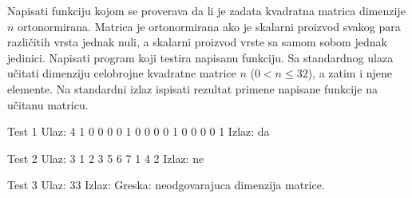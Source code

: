 \begin{Exercise}[label=324]
Napisati funkciju kojom se proverava da li je zadata kvadratna
matrica dimenzije $n$ ortonormirana. Matrica je ortonormirana
ako je skalarni proizvod svakog para različitih vrsta jednak
nuli, a skalarni proizvod vrste sa samom sobom jednak jedinici.
Napisati program koji testira napisanu funkciju. Sa standardnog
ulaza učitati dimenziju celobrojne kvadratne matrice $n$
($0 < n \leq 32$), a zatim i njene elemente. Na standardni izlaz
ispisati rezultat primene napisane funkcije na učitanu
matricu.

\begin{minitest}
\begin{test}{Test 1}
Ulaz:  4
       1 0 0 0
       0 1 0 0
       0 0 1 0
       0 0 0 1
Izlaz: da
\end{test}
\end{minitest}
\begin{minitest}
\begin{test}{Test 2}
Ulaz:  3
       1 2 3
       5 6 7
       1 4 2
Izlaz: ne
\end{test}
\end{minitest}

\begin{maxitest}
\begin{test}{Test 3}
Ulaz:  33       
Izlaz: Greska: neodgovarajuca dimenzija matrice.
\end{test}
\end{maxitest}
\end{Exercise}
\begin{Answer}[ref=324]
\end{Answer}


